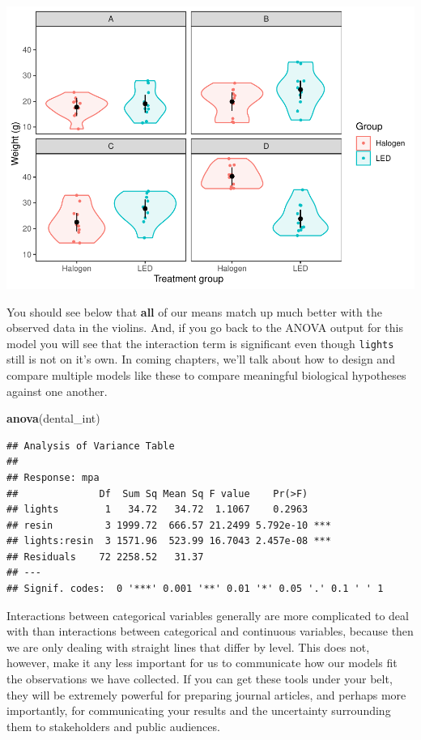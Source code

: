 \documentclass[
]{book}
\newenvironment{Shaded}{\begin{snugshade}}{\end{snugshade}}
\newcommand{\KeywordTok}[1]{\textcolor[rgb]{0.13,0.29,0.53}{\textbf{#1}}}
\newcommand{\NormalTok}[1]{#1}
\begin{document}
\includegraphics{worstr_files/figure-latex/unnamed-chunk-274-1.pdf}

You should see below that \textbf{all} of our means match up much better with the observed data in the violins. And, if you go back to the ANOVA output for this model you will see that the interaction term is significant even though \texttt{lights} still is not on it's own. In coming chapters, we'll talk about how to design and compare multiple models like these to compare meaningful biological hypotheses against one another.

\begin{Shaded}
\begin{Highlighting}[]
\KeywordTok{anova}\NormalTok{(dental_int)}
\end{Highlighting}
\end{Shaded}

\begin{verbatim}
## Analysis of Variance Table
## 
## Response: mpa
##              Df  Sum Sq Mean Sq F value    Pr(>F)    
## lights        1   34.72   34.72  1.1067    0.2963    
## resin         3 1999.72  666.57 21.2499 5.792e-10 ***
## lights:resin  3 1571.96  523.99 16.7043 2.457e-08 ***
## Residuals    72 2258.52   31.37                      
## ---
## Signif. codes:  0 '***' 0.001 '**' 0.01 '*' 0.05 '.' 0.1 ' ' 1
\end{verbatim}

Interactions between categorical variables generally are more complicated to deal with than interactions between categorical and continuous variables, because then we are only dealing with straight lines that differ by level. This does not, however, make it any less important for us to communicate how our models fit the observations we have collected. If you can get these tools under your belt, they will be extremely powerful for preparing journal articles, and perhaps more importantly, for communicating your results and the uncertainty surrounding them to stakeholders and public audiences.
\end{document}
